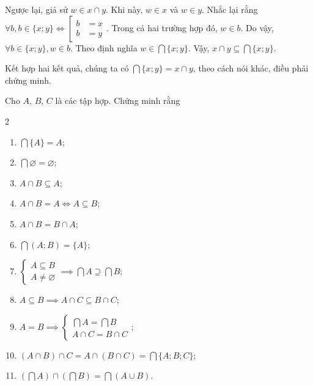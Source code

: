 Ngược lại, giả sử $w \in x \cap y$. Khi này, $w \in x$ và $w \in y$. Nhắc lại rằng $\forall b, b \in \{x; y\} \iff \left[\begin{aligned}
   b &= x \\
   b &= y
\end{aligned}\right.$. Trong cả hai trường hợp đó, $w \in b$. Do vậy, $\forall b \in \{x; y\}, w \in b$. Theo định nghĩa $w \in \bigcap \{x; y\}$. Vậy, $x \cap y \subseteq \bigcap \{x; y\}$.

Kết hợp hai kết quả, chúng ta có $\bigcap \{x; y\} = x \cap y$, theo cách nói khác, điều phải chứng minh.

\exercise Cho $A$, $B$, $C$ là các tập hợp. Chứng minh rằng
\begin{multicols}{2}
   \begin{enumerate}
      \item $\bigcap \{A\} = A$;
      \item $\bigcap \varnothing = \varnothing$;
      \item $A \cap B \subseteq A$;
      \item $A \cap B = A \iff A \subseteq B$;
      \item $A \cap B = B \cap A$;
      \item $\bigcap (A; B) = \{A\}$;
      \item $\begin{cases}
         A \subseteq B \\
         A \neq \varnothing
      \end{cases} \implies \bigcap A \supseteq \bigcap B$;
      \item $A \subseteq B \implies A \cap C \subseteq B \cap C$;
      \item $A = B \implies \begin{cases}
               \bigcap A = \bigcap B \\
               A \cap C = B \cap C
            \end{cases}$; 
      \item $(A \cap B) \cap C = A \cap (B \cap C) = \bigcap \{A; B; C\}$;
      \item $\left(\bigcap A\right) \cap \left(\bigcap B\right) = \bigcap (A \cup B)$.
   \end{enumerate} 
\end{multicols}

\solution

